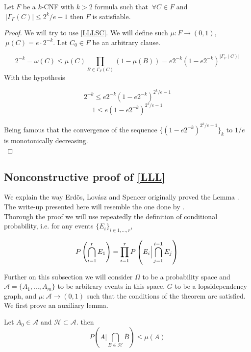 \begin{corollary}
	Let $F$ be a $k$-CNF with $k>2$ formula such that $\ \forall C \in F$ and $\ |\Gamma_F(C)|\le 2^k/e-1$ then $F$ is satisfiable.
\end{corollary}
\begin{proof}
	
	 We will try to use \ref{LLLSC}. We will define such $\mu: F \to (0,1),$$\ \mu(C)=e\cdot 2^{-k}$. Let $C_0\in F$ be an arbitrary clause.
	 
	 \[
	 2^{-k}=\omega(C)\le  \mu(C) \prod_{B\in\Gamma_F(C)} (1-\mu(B)) = e2^{-k}(1-e 2^{-k})^{|\Gamma_F(C)|}
	 \]
	 With the hypothesis
	 
	\[
		 2^{-k} \le  e 2^{-k}(1-e2^{-k})^{2^k/e-1}\]\[
		 1  \le e(1-e2^{-k})^{2^k/e-1}
	\]
	
	Being famous that the convergence of the sequence $\{(1-e2^{-k})^{2^k/e-1}\}_k$ to $1/e$ is monotonically decreasing.\\
\end{proof}



\subsection{Nonconstructive proof of \ref{LLL}}

We explain the way Erdös, Lovász and Spencer originally proved the Lemma \cite{erdos1973problems} \cite{spencer1977asymptotic}. The write-up presented here will resemble the one done by
 \cite{moser2013exact}.\\



Thorough the proof we will use repeatedly the definition of conditional probability, i.e. for any events $\{E_i\}_{i\in 1,...,r}$,

\[
P\left ( \bigcap_{i=1}^r E_1\right ) = \prod_{i=1}^rP \left( E_i \Big | \bigcap_{j=1}^{i-1} E_j\right)\\
\]

Further on this subsection we will consider  $\Omega$ to be a probability space and $\mathcal{A} = \{A_1,...,A_m\}$ to be arbitrary events in this space, $G$ to be a lopsidependency graph, and $\mu: \mathcal{A} \to (0,1)$ such that the conditions of the theorem are satisfied. We first prove an auxiliary lemma.

\begin{lemma} \label{LemaLLL}
Let $ A_0 \in \mathcal{A} $ and $\mathcal{H}\subset \mathcal{A} $. then 
\[
	P\left ( A \Big| \bigcap_{B\in \mathcal{H}} \overline{B}\right ) \le \mu(A) 
\]

		
\end{lemma}


